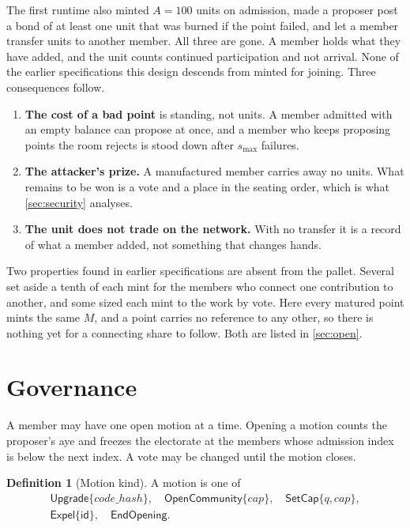 \documentclass[11pt,a4paper]{article}
\theoremstyle{definition}
\newtheorem{definition}{Definition}[section]
\theoremstyle{plain}
\theoremstyle{remark}
\newcommand{\id}{\mathsf{id}}
\begin{document}
The first runtime also minted $A = 100$ units on admission, made a proposer post a bond of at least one unit that was burned if the point failed, and let a member transfer units to another member. All three are gone. A member holds what they have added, and the unit counts continued participation and not arrival. None of the earlier specifications this design descends from minted for joining. Three consequences follow.

\begin{enumerate}
  \item \textbf{The cost of a bad point} is standing, not units. A member admitted with an empty balance can propose at once, and a member who keeps proposing points the room rejects is stood down after $s_{\max}$ failures.
  \item \textbf{The attacker's prize.} A manufactured member carries away no units. What remains to be won is a vote and a place in the seating order, which is what \cref{sec:security} analyses.
  \item \textbf{The unit does not trade on the network.} With no transfer it is a record of what a member added, not something that changes hands.
\end{enumerate}

Two properties found in earlier specifications are absent from the pallet. Several set aside a tenth of each mint for the members who connect one contribution to another, and some sized each mint to the work by vote. Here every matured point mints the same $M$, and a point carries no reference to any other, so there is nothing yet for a connecting share to follow. Both are listed in \cref{sec:open}.

\section{Governance}
\label{sec:governance}

A member may have one open motion at a time. Opening a motion counts the proposer's aye and freezes the electorate at the members whose admission index is below the next index. A vote may be changed until the motion closes.

\begin{definition}[Motion kind]
A motion is one of
\begin{gather*}
  \mathsf{Upgrade}\{\mathit{code\_hash}\},\quad \mathsf{OpenCommunity}\{\mathit{cap}\},\quad \mathsf{SetCap}\{q, \mathit{cap}\},\\
  \mathsf{Expel}\{\id\},\quad \mathsf{EndOpening}.
\end{gather*}
\end{definition}
\end{document}

